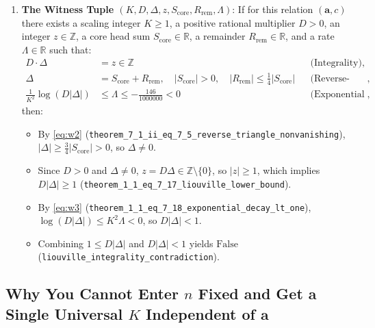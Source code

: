 \documentclass[11pt,a4paper]{article}
\begin{document}
\begin{enumerate}
  \item \textbf{The Witness Tuple $(K, D, \Delta, z, S_{\mathrm{core}}, R_{\mathrm{rem}}, \Lambda)$}:
  If for this relation $(\mathbf{a}, c)$ there exists a scaling integer $K \ge 1$, a positive rational multiplier $D > 0$, an integer $z \in \mathbb{Z}$, a core head sum $S_{\mathrm{core}} \in \mathbb{R}$, a remainder $R_{\mathrm{rem}} \in \mathbb{R}$, and a rate $\Lambda \in \mathbb{R}$ such that:
  \begin{align}
    D \cdot \Delta &= z \in \mathbb{Z} && \text{(Integrality)}, \label{eq:w1}\\
    \Delta &= S_{\mathrm{core}} + R_{\mathrm{rem}}, \quad |S_{\mathrm{core}}| > 0, \quad |R_{\mathrm{rem}}| \le \tfrac{1}{4}|S_{\mathrm{core}}| && \text{(Reverse-triangle non-vanishing)}, \label{eq:w2}\\
    \frac{1}{K^2}\log(D|\Delta|) &\le \Lambda \le -\frac{146}{1000000} < 0 && \text{(Exponential contraction)}, \label{eq:w3}
  \end{align}
  then:
  \begin{itemize}
    \item By \eqref{eq:w2} (\texttt{theorem\_7\_1\_ii\_eq\_7\_5\_reverse\_triangle\_nonvanishing}), $|\Delta| \ge \frac{3}{4}|S_{\mathrm{core}}| > 0$, so $\Delta \neq 0$.
    \item Since $D > 0$ and $\Delta \neq 0$, $z = D\Delta \in \mathbb{Z} \setminus \{0\}$, so $|z| \ge 1$, which implies $D|\Delta| \ge 1$ (\texttt{theorem\_1\_1\_eq\_7\_17\_liouville\_lower\_bound}).
    \item By \eqref{eq:w3} (\texttt{theorem\_1\_1\_eq\_7\_18\_exponential\_decay\_lt\_one}), $\log(D|\Delta|) \le K^2 \Lambda < 0$, so $D|\Delta| < 1$.
    \item Combining $1 \le D|\Delta|$ and $D|\Delta| < 1$ yields $\mathrm{False}$ (\texttt{liouville\_integrality\_contradiction}).
  \end{itemize}
\end{enumerate}

\subsection{Why You Cannot Enter $n$ Fixed and Get a Single Universal $K$ Independent of $\mathbf{a}$}
\end{document}
